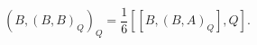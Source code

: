 \begin{equation}
\left(  B,(B,B)_{Q}\right)  _{Q}=\frac{1}{6}\left[  [B,(B,A)_{Q}],Q\right]
.\label{1.10}%
\end{equation}


